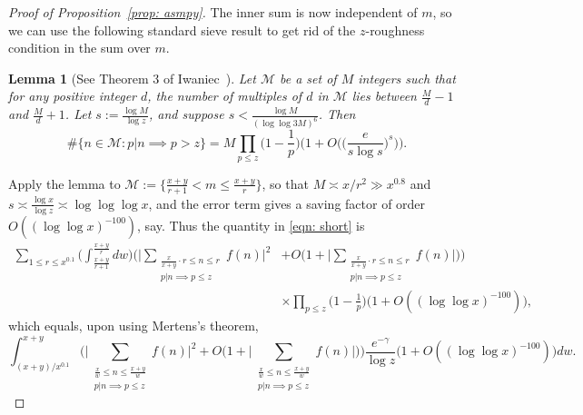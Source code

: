 \documentclass[12pt, notitlepage]{amsart}
\numberwithin{equation}{section}
\newtheorem{lemma}[theorem]{Lemma}
\theoremstyle{remark}
\theoremstyle{definition}
\theoremstyle{remark}
\numberwithin{equation}{section}
\begin{document}
\begin{proof}[Proof of Proposition~\ref{prop: asmpy}]
The inner sum is now independent of $m$, so we can use the following standard sieve result to get rid of the $z$-roughness condition in the sum over $m$. 

\begin{lemma}[See Theorem 3 of Iwaniec~\cite{Iwaniec}]\label{lem: sieve}
    Let $\mathcal{M}$ be a set of $M$ integers such that for any positive integer $d$, the number of multiples of $d$ in $\mathcal{M}$ lies between $\frac{M}{d}-1$ and $\frac{M}{d} +1$. Let $s:= \frac{\log M}{\log z}$, and suppose $s < \frac{\log M}{(\log\log 3M)^6}$. Then 
    \[\#\{ n\in \mathcal{M}: p|n \implies p>z \} = M \prod_{p\le z} \Big(1-\frac{1}{p}\Big) \Big(1+ O\Big(\Big(\frac{e}{s\log s}\Big)^{s}\Big)\Big).   \]
\end{lemma}

Apply the lemma to $\mathcal{M} := \{\frac{x+y}{r+1} < m \le \frac{x+y}{r}\}$, so that $M\asymp x /r^{2} \gg x^{0.8}$ and $s \asymp \frac{\log x}{\log z} \asymp \log \log \log x$, and the error term gives a saving factor of order $O((\log \log x)^{-100})$, say. Thus the quantity in \eqref{eqn: short} is
\begin{align*}
 \sum_{1\le r \le x^{0.1}} \Big( \int_{\frac{x+y}{r+1}}^{\frac{x+y}{r}} dw \Big) \Big(\Big| \sum_{\substack{ \frac{x}{x+y} \cdot r
\le n \le r \\ p|n \implies p\le z  }  } f(n) \Big|^{2} &+O\Big(1 + \Big| \sum_{\substack{ \frac{x}{x+y} \cdot r
\le n \le r \\ p|n \implies p\le z  }  } f(n) \Big|\Big)  \Big)\\
& \times \prod_{p\le z} \Big(1-\frac{1}{p}\Big) \Big(1 + O((\log \log x)^{-100}) \Big), 
\end{align*}
which equals, upon using Mertens's theorem, 
\begin{equation}\label{eqn: Aaftersieve}
    \int_{(x+y)/x^{0.1}}^{x+y} \Big( \Big| \sum_{\substack{ \frac{x}{w} 
\le n \le \frac{x+y}{w} \\ p|n \implies p\le z  }  } f(n) \Big|^{2} + O\Big(1+\Big| \sum_{\substack{ \frac{x}{w} 
\le n \le \frac{x+y}{w} \\ p|n \implies p\le z  }  } f(n) \Big|\Big) \Big) \frac{e^{-\gamma}}{\log z}  \Big(1 + O((\log \log x)^{-100}) \Big)  dw.
\end{equation}


\end{proof}
\end{document}
